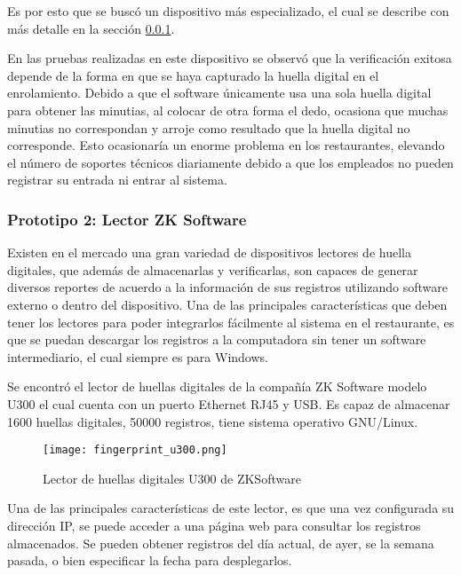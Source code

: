 Es por esto que se buscó un dispositivo más especializado, el cual se describe con más detalle en la sección \ref{sec:lector_zksoftware}.

En las pruebas realizadas en este dispositivo se observó que la verificación exitosa depende de la forma en que se haya capturado la huella digital en el enrolamiento. Debido a que el software únicamente usa una sola huella digital para obtener las minutias, al colocar de otra forma el dedo, ocasiona que muchas minutias no correspondan y arroje como resultado que la huella digital no corresponde. Esto ocasionaría un enorme problema en los restaurantes, elevando el número de soportes técnicos diariamente debido a que los empleados no pueden registrar su entrada ni entrar al sistema.

\subsubsection{Prototipo 2: Lector ZK Software}
\label{sec:lector_zksoftware}

Existen en el mercado una gran variedad de dispositivos lectores de huella digitales, que además de almacenarlas y verificarlas, son capaces de generar diversos reportes de acuerdo a la información de sus registros utilizando software externo o dentro del dispositivo. Una de las principales características que deben tener los lectores para poder integrarlos fácilmente al sistema en el restaurante, es que se puedan descargar los registros a la computadora sin tener un software intermediario, el cual siempre es para Windows. 

Se encontró el lector de huellas digitales de la compañía ZK Software modelo U300 el cual cuenta con un puerto Ethernet RJ45 y USB. Es capaz de almacenar 1600 huellas digitales, 50000 registros, tiene sistema operativo GNU/Linux.

\begin{figure}[htb]
 \begin{center}
  \texttt{[image: fingerprint\_u300.png]}
 \end{center}
 \caption{Lector de huellas digitales U300 de ZKSoftware}
 \label{fig:finger_print_7}
\end{figure}

Una de las principales características de este lector, es que una vez configurada su dirección IP, se puede acceder a una página web para consultar los registros almacenados. Se pueden obtener registros del día actual, de ayer, se la semana pasada, o bien especificar la fecha para desplegarlos. 

